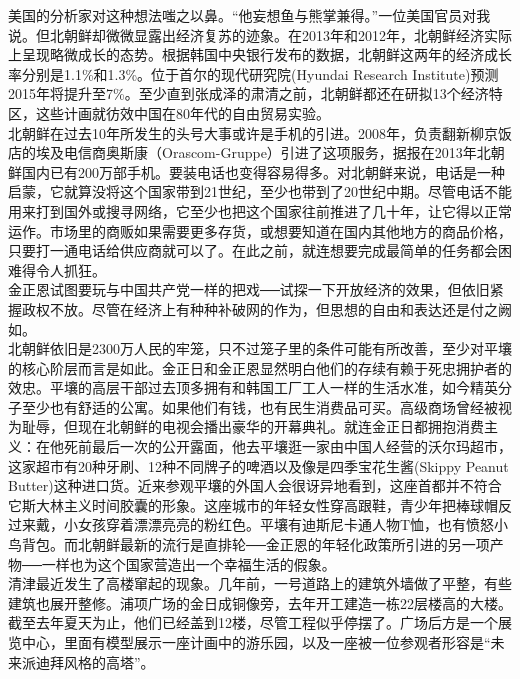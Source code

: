 美国的分析家对这种想法嗤之以鼻。“他妄想鱼与熊掌兼得。”一位美国官员对我说。但北朝鲜却微微显露出经济复苏的迹象。在2013年和2012年，北朝鲜经济实际上呈现略微成长的态势。根据韩国中央银行发布的数据，北朝鲜这两年的经济成长率分别是1.1\%和1.3\%。位于首尔的现代研究院(Hyundai Research Institute)预测2015年将提升至7\%。至少直到张成泽的肃清之前，北朝鲜都还在研拟13个经济特区，这些计画就彷效中国在80年代的自由贸易实验。\\

北朝鲜在过去10年所发生的头号大事或许是手机的引进。2008年，负责翻新柳京饭店的埃及电信商奥斯康（Orascom-Gruppe）引进了这项服务，据报在2013年北朝鲜国内已有200万部手机。要装电话也变得容易得多。对北朝鲜来说，电话是一种启蒙，它就算没将这个国家带到21世纪，至少也带到了20世纪中期。尽管电话不能用来打到国外或搜寻网络，它至少也把这个国家往前推进了几十年，让它得以正常运作。市场里的商贩如果需要更多存货，或想要知道在国内其他地方的商品价格，只要打一通电话给供应商就可以了。在此之前，就连想要完成最简单的任务都会困难得令人抓狂。\\

金正恩试图要玩与中国共产党一样的把戏──试探一下开放经济的效果，但依旧紧握政权不放。尽管在经济上有种种补破网的作为，但思想的自由和表达还是付之阙如。\\

北朝鲜依旧是2300万人民的牢笼，只不过笼子里的条件可能有所改善，至少对平壤的核心阶层而言是如此。金正日和金正恩显然明白他们的存续有赖于死忠拥护者的效忠。平壤的高层干部过去顶多拥有和韩国工厂工人一样的生活水准，如今精英分子至少也有舒适的公寓。如果他们有钱，也有民生消费品可买。高级商场曾经被视为耻辱，但现在北朝鲜的电视会播出豪华的开幕典礼。就连金正日都拥抱消费主义：在他死前最后一次的公开露面，他去平壤逛一家由中国人经营的沃尔玛超市，这家超市有20种牙刷、12种不同牌子的啤酒以及像是四季宝花生酱(Skippy Peanut Butter)这种进口货。近来参观平壤的外国人会很讶异地看到，这座首都并不符合它斯大林主义时间胶囊的形象。这座城市的年轻女性穿高跟鞋，青少年把棒球帽反过来戴，小女孩穿着漂漂亮亮的粉红色。平壤有迪斯尼卡通人物T恤，也有愤怒小鸟背包。而北朝鲜最新的流行是直排轮──金正恩的年轻化政策所引进的另一项产物──一样也为这个国家营造出一个幸福生活的假象。\\

清津最近发生了高楼窜起的现象。几年前，一号道路上的建筑外墙做了平整，有些建筑也展开整修。浦项广场的金日成铜像旁，去年开工建造一栋22层楼高的大楼。截至去年夏天为止，他们已经盖到12楼，尽管工程似乎停摆了。广场后方是一个展览中心，里面有模型展示一座计画中的游乐园，以及一座被一位参观者形容是“未来派迪拜风格的高塔”。\\

